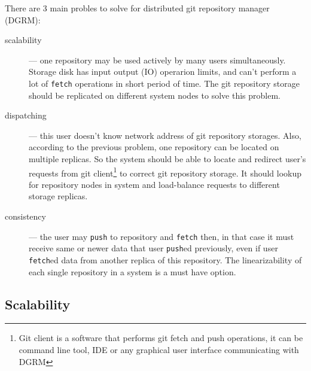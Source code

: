 \documentclass[nonacm=true]{acmart}
\newcommand{\code}[1]{\texttt{#1}}
\begin{document}
There are 3 main probles to solve for distributed git repository manager (DGRM):
\begin{description}
\item[scalability] --- one repository may be used actively by many users simultaneously. Storage disk
  has input output (IO) operarion limits, and can't perform a lot of \code{fetch} operations in
  short period of time. The git repository storage should be replicated on different system nodes to
  solve this problem.
\item[dispatching] --- this user doesn't know network address of git repository storages. Also, according to the
  previous problem, one repository can be located on multiple replicas.
  So the system should be able to locate and redirect user's requests
  from git client\footnote{Git client is a software that performs git fetch and push operations, it can be
  command line tool, IDE or any graphical user interface communicating with DGRM} to correct git repository
  storage. It should lookup for repository nodes in system and load-balance requests to different storage replicas.
\item[consistency] --- the user may \code{push} to repository and \code{fetch} then, in that case it must receive
  same or newer data that user \code{push}ed previously, even if user \code{fetch}ed data from another
  replica of this repository. The linearizability of each single repository in a system is a must have option.
\end{description}

\subsection{Scalability}
\end{document}
